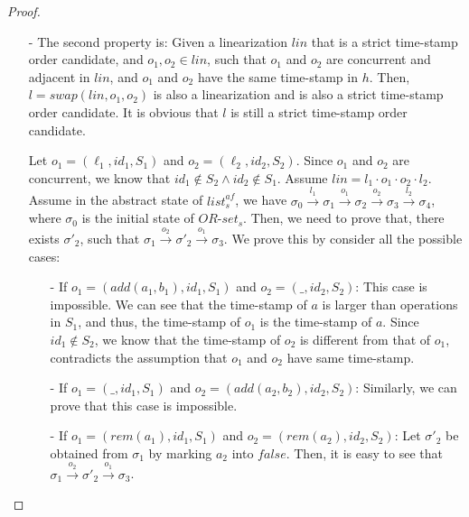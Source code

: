 {\begin {proof}
\begin{itemize}
    Since $o$ and $o'$ are adjacent and $(o,o') \in \mathit{diff}(\mathit{lin},\mathit{lin}')$, by assumption we know that $o$ and $o'$ are not concurrent. Or we can say, $(o,o') \in \mathit{vis} \vee \mathit{o',o} \in \mathit{vis}$. This contradicts that both $\mathit{lin}$ and $\mathit{lin}'$ are consistent with visibility relation. This completes the proof of the first step.

\item[-] The second property is: Given a linearization $\mathit{lin}$ that is a strict time-stamp order candidate, and $o_1,o_2 \in \mathit{lin}$, such that $o_1$ and $o_2$ are concurrent and adjacent in $\mathit{lin}$, and $o_1$ and $o_2$ have the same time-stamp in $h$. Then, $l = \mathit{swap}(\mathit{lin},o_1,o_2)$ is also a linearization and is also a strict time-stamp order candidate. It is obvious that $l$ is still a strict time-stamp order candidate.

    Let $o_1 = (\ell_1,\mathit{id}_1,S_1)$ and $o_2 = (\ell_2,\mathit{id}_2,S_2)$. Since $o_1$ and $o_2$ are concurrent, we know that $\mathit{id}_1 \notin S_2 \wedge \mathit{id}_2 \notin S_1$. Assume $\mathit{lin} = l_1 \cdot o_1 \cdot o_2 \cdot l_2$. Assume in the abstract state of $\mathit{list}_s^{\mathit{af}}$, we have $\sigma_0 {\xrightarrow{l_1}} \sigma_1 {\xrightarrow{o_1}} \sigma_2 {\xrightarrow{o_2}} \sigma_3 {\xrightarrow{l_2}} \sigma_4$, where $\sigma_0$ is the initial state of $\mathit{OR}$-$\mathit{set}_s$. Then, we need to prove that, there exists $\sigma'_2$, such that $\sigma_1 {\xrightarrow{o_2}} \sigma'_2 {\xrightarrow{o_1}} \sigma_3$. We prove this by consider all the possible cases:

    \begin{itemize}
    \setlength{\itemsep}{0.5pt}
    \item[-] If $o_1 = (\mathit{add}(a_1,b_1),\mathit{id}_1,S_1)$ and $o_2 = (\_,\mathit{id}_2,S_2)$: This case is impossible. We can see that the time-stamp of $a$ is larger than operations in $S_1$, and thus, the time-stamp of $o_1$ is the time-stamp of $a$. Since $\mathit{id}_1 \notin S_2$, we know that the time-stamp of $o_2$ is different from that of $o_1$, contradicts the assumption that $o_1$ and $o_2$ have same time-stamp.

    \item[-] If $o_1 = (\_,\mathit{id}_1,S_1)$ and $o_2 = (\mathit{add}(a_2,b_2),\mathit{id}_2,S_2)$: Similarly, we can prove that this case is impossible.

    \item[-] If $o_1 = (\mathit{rem}(a_1),\mathit{id}_1,S_1)$ and $o_2 = (\mathit{rem}(a_2),\mathit{id}_2,S_2)$: Let $\sigma'_2$ be obtained from $\sigma_1$ by marking $a_2$ into $\mathit{false}$. Then, it is easy to see that $\sigma_1 {\xrightarrow{o_2}} \sigma'_2 {\xrightarrow{o_1}} \sigma_3$.


\end{itemize}
\end{itemize}
\end{proof}}
